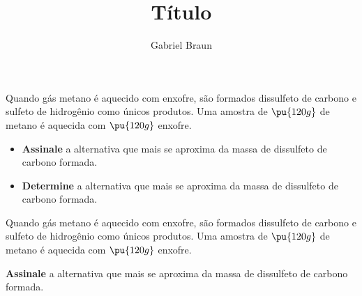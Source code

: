 \documentclass[braun, twocolumn]{braun}
\title{Título}
\affiliation{Colégio e Curso Pensi, Turma IME-ITA}
\author{Gabriel Braun}
\begin{document}
\maketitle[botrule=false]

\begin{problem}
    Quando gás metano é aquecido com enxofre, são formados dissulfeto de
carbono e sulfeto de hidrogênio como únicos produtos. Uma amostra de
\(\pu{120 g}\) de metano é aquecida com \(\pu{120 g}\) enxofre.

\begin{itemize}
\item
  \textbf{Assinale} a alternativa que mais se aproxima da massa de
  dissulfeto de carbono formada.
\item
  \textbf{Determine} a alternativa que mais se aproxima da massa de
  dissulfeto de carbono formada.
\end{itemize}
\end{problem}

\begin{problem}
    Quando gás metano é aquecido com enxofre, são formados dissulfeto de
carbono e sulfeto de hidrogênio como únicos produtos. Uma amostra de
\(\pu{120 g}\) de metano é aquecida com \(\pu{120 g}\) enxofre.

\textbf{Assinale} a alternativa que mais se aproxima da massa de
dissulfeto de carbono formada.
\end{problem}
\end{document}
